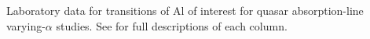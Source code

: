 Laboratory data for transitions of Al of interest for quasar absorption-line varying-$\alpha$ studies. See  for full descriptions of each column.
